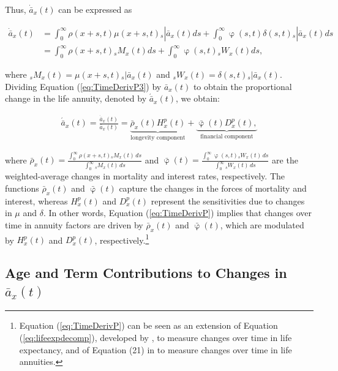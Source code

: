 \documentclass[12pt]{article}
\begin{document}
Thus, $\dot{\bar{a}} _x(t)$ can be expressed as


\begin{equation}\label{eq:TimeDerivP3}
\begin{split}
\dot{\bar{a}}_{x}(t) &=  \int_0^\infty \rho(x+s,t) \mu(x+s,t){}_s|\bar{a}_x(t) ds +\int_0^\infty  \upvarphi(s,t) \delta(s,t)  {}_s|\bar{a}_x(t) ds\\
&= \int_0^\infty \rho(x+s,t) {}_sM_x(t)  ds +\int_0^\infty  \upvarphi(s,t) {}_sW_x(t)  ds,
\end{split}
\end{equation}


where ${}_sM_x(t)= \mu(x+s,t){}_s|\bar{a}_x(t)$ and ${}_sW_x(t)=\delta(s,t)  {}_s|\bar{a}_x(t)$. Dividing Equation (\ref{eq:TimeDerivP3}) by $\bar{a}_x(t)$ to obtain the proportional change in the life annuity, denoted by $\acute{\bar{a}}_x(t)$, we obtain:


\begin{equation}\label{eq:TimeDerivP}
\begin{split}
 \acute{\bar{a}}_x(t) = \frac{\dot{\bar{a}}_x(t)}{\bar{a}_x(t)}  = 
 \underbrace{\bar{\rho}_x(t){H}^{p}_x(t)}_\text{longevity component}
 +\underbrace{\bar{\upvarphi}(t){D}^{p}_x(t),}_\text{financial component}
\end{split}
\end{equation}

where $\bar{\rho}_x(t) = \frac{\int_0^\infty \rho(x+s,t) {}_s M_x(t) \, ds}{\int_0^\infty {}_s M_x(t) \, ds}$ and 
$\bar{\upvarphi}(t) = \frac{\int_0^\infty \upvarphi(s,t) {}_s W_x(t) \, ds}{\int_0^\infty {}_s W_x(t) \, ds}$ are the weighted-average changes in mortality and interest rates, respectively. The functions $\bar{\rho}_x(t)$ and $\bar{\upvarphi}(t)$ capture the changes in the forces of mortality and interest, whereas ${H}^{p}_x(t)$ and ${D}^{p}_x(t)$ represent the sensitivities due to changes in $\mu$ and $\delta$. In other words, Equation (\ref{eq:TimeDerivP}) implies that changes over time in annuity factors are driven by $\bar{\rho}_x(t)$ and $\bar{\upvarphi}(t)$, which are modulated by ${H}^{p}_x(t)$ and ${D}^{p}_x(t)$, respectively.\footnote{Equation (\ref{eq:TimeDerivP}) can be seen as an extension of Equation (\ref{eq:lifeexpdecomp}), developed by \citet{Vaupel2003}, to measure changes over time in life expectancy, and of Equation (21) in \citet{di2025decomposing} to measure changes over time in life annuities.}

\subsection{Age and Term Contributions to Changes in $\bar{a}_x(t)$}
\end{document}
